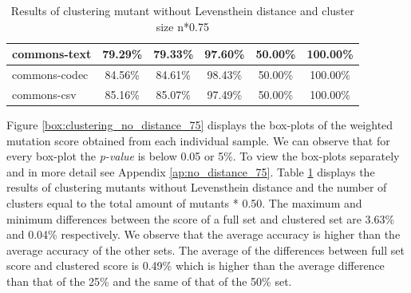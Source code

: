 \documentclass[../../main]{subfiles}
\begin{document}
\begin{table}[htb]
\begin{tabular}{|l|c|c|c|c|c|}
commons-text                  & 79.29\%                                                                                 & 79.33\%                                                                                     & 97.60\%                                                                              & 50.00\%                                                                               & 100.00\%                                                                             \\ \hline
commons-codec                 & 84.56\%                                                                                 & 84.61\%                                                                                     & 98.43\%                                                                              & 50.00\%                                                                               & 100.00\%                                                                             \\ \hline
commons-csv                   & 85.16\%                                                                                 & 85.07\%                                                                                     & 97.49\%                                                                              & 50.00\%                                                                               & 100.00\%                                                                             \\ \hline
\end{tabular}
\caption{\label{tab:clustering_no_distance_75}Results of clustering mutant without Levensthein distance and cluster size n*0.75}
\end{table}
\FloatBarrier

Figure \ref{box:clustering_no_distance_75} displays the box-plots of the weighted mutation score obtained from each individual sample. 
We can observe that for every box-plot the \textit{p-value} is below 0.05 or 5\%.
To view the box-plots separately and in more detail see Appendix \ref{ap:no_distance_75}.
Table \ref{tab:clustering_no_distance_75} displays the results of clustering mutants without Levensthein distance and the number of clusters equal to the total amount of mutants * 0.50.
The maximum and minimum differences between the score of a full set and clustered set are 3.63\% and 0.04\% respectively.
We observe that the average accuracy is higher than the average accuracy of the other sets.
The average of the differences between full set score and clustered score is  0.49\% which is higher than the average difference than that of the 25\% and the same of that of the 50\% set.
\end{document}
